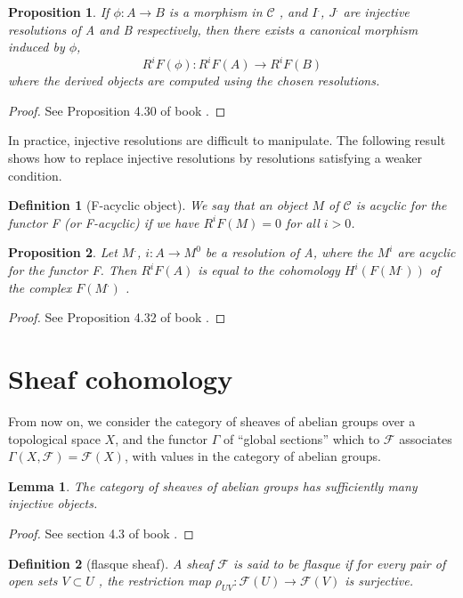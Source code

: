 \documentclass{article}
\numberwithin{equation}{subsection} %
\newtheorem{defi}{Definition}[section]
\newtheorem{lemma}{Lemma}[section]
\newtheorem{prop}{Proposition}[section]
\theoremstyle{definition}
\begin{document}
\begin{prop}
If $\phi:A\to B$ is a morphism in $\mathcal{C}$ , and $I^.$, $J^.$ are injective resolutions of A and B respectively, then there exists a canonical morphism induced by $\phi$,
$$R^iF(\phi):R^iF(A)\to R^iF(B)$$
where the derived objects are computed using the chosen resolutions.
\end{prop}
\begin{proof}
	See Proposition 4.30 of book \cite{voisin}.
\end{proof}
In practice, injective resolutions are difficult to manipulate. The following
result shows how to replace injective resolutions by resolutions satisfying a
weaker condition.

\begin{defi}[F-acyclic object]
We say that an object $M$ of $\mathcal{C}$ is acyclic for the functor F (or F-acyclic) if we have $R^iF(M)=0$ for all $i>0$.
\end{defi}

\begin{prop}
	Let $M^.$, $i: A\to M^0$ be a resolution of A, where the $M^i$ are acyclic for the functor F. Then $R^i F(A)$ is equal to the cohomology $H^i(F(M^.))$ of the complex $F(M^.)$ .
\end{prop}
\begin{proof}
	See Proposition 4.32 of book \cite{voisin}.
\end{proof}
\section{Sheaf cohomology}
 From now on, we consider the category of sheaves of abelian groups over a topological space $X$, and the functor $\Gamma$ of “global sections” which to $\mathcal{F}$ associates$\Gamma (X,\mathcal{F})=\mathcal{F}(X)$, with values in the category of abelian groups.

\begin{lemma}
The category of sheaves of abelian groups has sufficiently many injective objects.
\end{lemma}
\begin{proof}
	See section 4.3 of book \cite{voisin}.
\end{proof}

\begin{defi}[flasque sheaf]
A sheaf $\mathcal{F}$ is said to be flasque if for every pair of open sets $V\subset U$ , the restriction map $\rho _{UV} : \mathcal{F}(U) \to \mathcal{F}(V)$ is surjective.
\end{defi}
\end{document}
